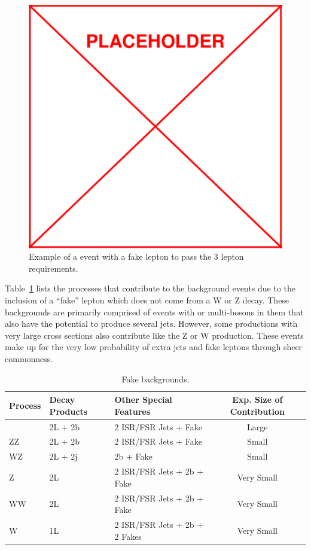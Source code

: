 			\begin{figure}[h]
\begin{center}
\includegraphics[width=0.48\linewidth]{Figs/placeholder.pdf}
\caption{\label{fig:tt_w_fake}
Example of a \ttbar event with a fake lepton to pass the 3 lepton requirements.
}
\end{center}
\end{figure} 



	Table~\ref{tab:fake_bkg} lists the processes that contribute to the background events due to the inclusion of a ``fake'' lepton which does not come from a W or Z decay. These backgrounds are primarily comprised of events with \ttbar or multi-bosons in them that also have the potential to produce several jets. However, some productions with very large cross sections also contribute like the Z or W production. These events make up for the very low probability of extra jets and fake leptons through sheer commonness.
			
	\begin{table}[hbt]
	\begin{center}
	\begin{tabular}{l|ll|c}\hline\hline %
	Process & Decay Products & Other Special Features & Exp. Size of Contribution\\
	\hline
	\ttbar & 2L + 2b & 2 ISR/FSR Jets + Fake & Large\\
	ZZ & 2L + 2b & 2 ISR/FSR Jets + Fake & Small\\
	WZ & 2L + 2j & 2b + Fake & Small\\
	Z & 2L & 2 ISR/FSR Jets + 2b + Fake & Very Small\\
	WW & 2L & 2 ISR/FSR Jets + 2b + Fake & Very Small\\
	W & 1L & 2 ISR/FSR Jets + 2b + 2 Fakes & Very Small\\
	\hline \hline
	\end{tabular}
	\caption{\label{tab:fake_bkg} Fake backgrounds.}
	\end{center}
	\end{table}



